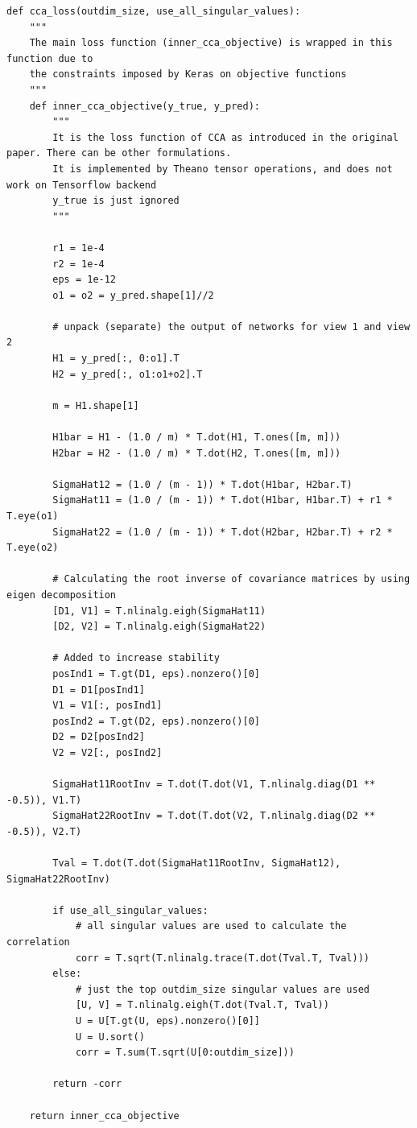 \documentclass[a4paper]{article}
\begin{document}
\begin{verbatim}
def cca_loss(outdim_size, use_all_singular_values):
    """
    The main loss function (inner_cca_objective) is wrapped in this function due to
    the constraints imposed by Keras on objective functions
    """
    def inner_cca_objective(y_true, y_pred):
        """
        It is the loss function of CCA as introduced in the original paper. There can be other formulations.
        It is implemented by Theano tensor operations, and does not work on Tensorflow backend
        y_true is just ignored
        """

        r1 = 1e-4
        r2 = 1e-4
        eps = 1e-12
        o1 = o2 = y_pred.shape[1]//2

        # unpack (separate) the output of networks for view 1 and view 2
        H1 = y_pred[:, 0:o1].T
        H2 = y_pred[:, o1:o1+o2].T

        m = H1.shape[1]

        H1bar = H1 - (1.0 / m) * T.dot(H1, T.ones([m, m]))
        H2bar = H2 - (1.0 / m) * T.dot(H2, T.ones([m, m]))

        SigmaHat12 = (1.0 / (m - 1)) * T.dot(H1bar, H2bar.T)
        SigmaHat11 = (1.0 / (m - 1)) * T.dot(H1bar, H1bar.T) + r1 * T.eye(o1)
        SigmaHat22 = (1.0 / (m - 1)) * T.dot(H2bar, H2bar.T) + r2 * T.eye(o2)

        # Calculating the root inverse of covariance matrices by using eigen decomposition
        [D1, V1] = T.nlinalg.eigh(SigmaHat11)
        [D2, V2] = T.nlinalg.eigh(SigmaHat22)

        # Added to increase stability
        posInd1 = T.gt(D1, eps).nonzero()[0]
        D1 = D1[posInd1]
        V1 = V1[:, posInd1]
        posInd2 = T.gt(D2, eps).nonzero()[0]
        D2 = D2[posInd2]
        V2 = V2[:, posInd2]

        SigmaHat11RootInv = T.dot(T.dot(V1, T.nlinalg.diag(D1 ** -0.5)), V1.T)
        SigmaHat22RootInv = T.dot(T.dot(V2, T.nlinalg.diag(D2 ** -0.5)), V2.T)

        Tval = T.dot(T.dot(SigmaHat11RootInv, SigmaHat12), SigmaHat22RootInv)

        if use_all_singular_values:
            # all singular values are used to calculate the correlation
            corr = T.sqrt(T.nlinalg.trace(T.dot(Tval.T, Tval)))
        else:
            # just the top outdim_size singular values are used
            [U, V] = T.nlinalg.eigh(T.dot(Tval.T, Tval))
            U = U[T.gt(U, eps).nonzero()[0]]
            U = U.sort()
            corr = T.sum(T.sqrt(U[0:outdim_size]))

        return -corr

    return inner_cca_objective
\end{verbatim}
\end{document}
